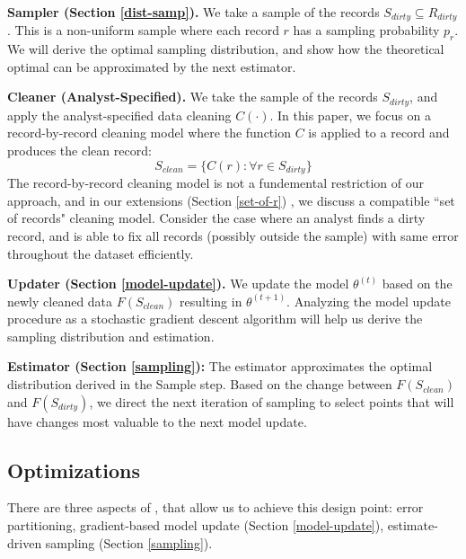 \noindent\textbf{Sampler (Section \ref{dist-samp}). } We take a sample of the records $S_{dirty} \subseteq R_{dirty}$. This is a non-uniform sample where each record $r$ has a sampling probability $p_r$.
We will derive the optimal sampling distribution, and show how the theoretical optimal can be approximated by the next estimator.

\vspace{0.5em}

\noindent\textbf{Cleaner (Analyst-Specified). } We take the sample of the records $S_{dirty}$, and apply the analyst-specified data cleaning $C(\cdot)$. In this paper, we focus on a record-by-record cleaning model where the function $C$ is applied to a record and produces the clean record:
\[
S_{clean} = \{C(r) : \forall r \in S_{dirty}\}
\]
The record-by-record cleaning model is not a fundemental restriction of our approach, and in our extensions (Section \ref{set-of-r}) , we discuss a compatible ``set of records" cleaning model. Consider the case where an analyst finds a dirty record, and is able to fix all records (possibly outside the sample) with same error throughout the dataset efficiently.

\vspace{0.5em}

\noindent\textbf{Updater (Section \ref{model-update}). } We update the model $\theta^{(t)}$ based on the newly cleaned data $F(S_{clean})$ resulting in $\theta^{(t+1)}$. Analyzing the model update procedure as a stochastic gradient descent algorithm will help us derive the sampling distribution and estimation.

\vspace{0.5em}

\noindent\textbf{Estimator (Section \ref{sampling}): } The estimator approximates the optimal distribution derived in the Sample step. Based on the change between $F(S_{clean})$ and $F(S_{dirty})$, we direct the next iteration of sampling to select points that will have changes most valuable to the next model update.

\iffalse
\subsection{Optimizations}
There are three aspects of \sys, that allow us to achieve this design point: error partitioning, gradient-based model update (Section \ref{model-update}), estimate-driven sampling (Section \ref{sampling}).

\vspace{0.5em}

